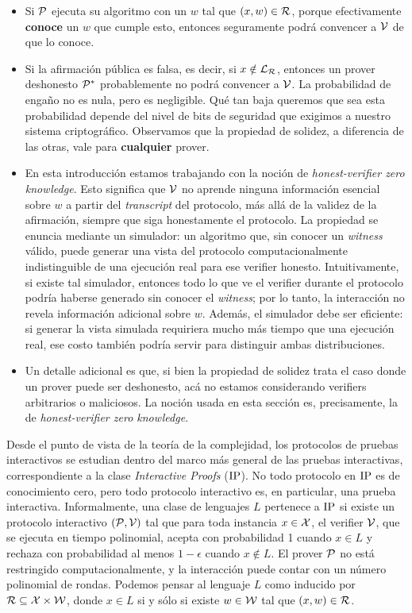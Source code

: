 \begin{itemize}[noitemsep]
	\item Si $\mathcal{P}$ ejecuta su algoritmo con un $w$ tal que $(x,w) \in \mathcal{R}$, porque efectivamente \textbf{conoce} un $w$ que cumple esto, entonces seguramente podrá convencer a $\mathcal{V}$ de que lo conoce.
		\item Si la afirmación pública es falsa, es decir, si $x \notin \mathcal{L}_{\mathcal{R}}$, entonces un prover deshonesto $\mathcal{P}^*$ probablemente no podrá convencer a $\mathcal{V}$. La probabilidad de engaño no es nula, pero es negligible. Qué tan baja queremos que sea esta probabilidad depende del nivel de bits de seguridad que exigimos a nuestro sistema criptográfico. Observamos que la propiedad de solidez, a diferencia de las otras, vale para \textbf{cualquier} prover.
		\item En esta introducción estamos trabajando con la noción de \textit{honest-verifier zero knowledge}. Esto significa que $\mathcal{V}$ no aprende ninguna información esencial sobre $w$ a partir del \textit{transcript} del protocolo, más allá de la validez de la afirmación, siempre que siga honestamente el protocolo. La propiedad se enuncia mediante un simulador: un algoritmo que, sin conocer un \textit{witness} válido, puede generar una vista del protocolo computacionalmente indistinguible de una ejecución real para ese verifier honesto. Intuitivamente, si existe tal simulador, entonces todo lo que ve el verifier durante el protocolo podría haberse generado sin conocer el \textit{witness}; por lo tanto, la interacción no revela información adicional sobre $w$. Además, el simulador debe ser eficiente: si generar la vista simulada requiriera mucho más tiempo que una ejecución real, ese costo también podría servir para distinguir ambas distribuciones.
		\item Un detalle adicional es que, si bien la propiedad de solidez trata el caso donde un prover puede ser deshonesto, acá no estamos considerando verifiers arbitrarios o maliciosos. La noción usada en esta sección es, precisamente, la de \textit{honest-verifier zero knowledge}.
\end{itemize}

Desde el punto de vista de la teoría de la complejidad, los protocolos de pruebas \ZK interactivos se estudian dentro del marco más general de las pruebas interactivas, correspondiente a la clase \textit{Interactive Proofs} ($\mathrm{IP}$). No todo protocolo en $\mathrm{IP}$ es de conocimiento cero, pero todo protocolo \ZK interactivo es, en particular, una prueba interactiva. Informalmente, una clase de lenguajes $L$ pertenece a $\mathrm{IP}$ si existe un protocolo interactivo $(\mathcal{P}, \mathcal{V})$ tal que para toda instancia $x \in \mathcal{X}$, el verifier $\mathcal{V}$, que se ejecuta en tiempo polinomial, acepta con probabilidad 1 cuando $x \in L$ y rechaza con probabilidad al menos $1 - \epsilon$ cuando $x \notin L$. El prover $\mathcal{P}$ no está restringido computacionalmente, y la interacción puede contar con un número polinomial de rondas. Podemos pensar al lenguaje $L$ como inducido por $\mathcal{R} \subseteq \mathcal{X} \times \mathcal{W}$, donde $x \in L$ si y sólo si existe $w \in \mathcal{W}$ tal que $(x,w) \in \mathcal{R}$.

